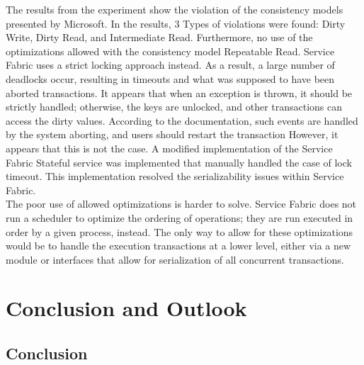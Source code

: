 \documentclass[a4paper,10pt,titlepage]{report}
\begin{document}
The results from the experiment show the violation of the consistency models presented by Microsoft. In the results, 3 Types of violations were found: Dirty Write, Dirty Read, and Intermediate Read. Furthermore, no use of the optimizations allowed with the consistency model Repeatable Read. Service Fabric uses a strict locking approach instead. As a result, a large number of deadlocks occur, resulting in timeouts and what was supposed to have been aborted transactions. It appears that when an exception is thrown, it should be strictly handled; otherwise, the keys are unlocked, and other transactions can access the dirty values. According to the documentation, such events are handled by the system aborting, and users should restart the transaction\cite{servicefabricguidelines}
However, it appears that this is not the case. A modified implementation of the Service Fabric Stateful service was implemented that manually handled the case of lock timeout. This implementation resolved the serializability issues within Service Fabric.\\
\vspace{5mm}
The poor use of allowed optimizations is harder to solve. Service Fabric does not run a scheduler to optimize the ordering of operations; they are run executed in order by a given process, instead. The only way to allow for these optimizations would be to handle the execution transactions at a lower level, either via a new module or interfaces that allow for serialization of all concurrent transactions.

\chapter{Conclusion and Outlook}
\section*{Conclusion}
\end{document}
